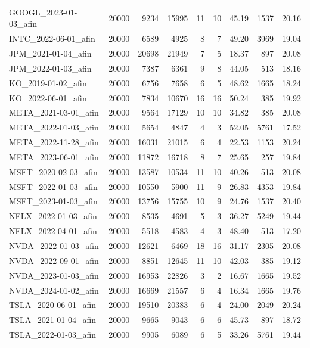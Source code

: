 \documentclass[10pt,a4paper,landscape]{article}
\begin{document}
\begin{longtable}{lrrrrrrrr}
GOOGL\_2023-01-03\_afin & 20000 & 9234 & 15995 & 11 & 10 & 45.19 & 1537 & 20.16 \\
INTC\_2022-06-01\_afin & 20000 & 6589 & 4925 & 8 & 7 & 49.20 & 3969 & 19.04 \\
JPM\_2021-01-04\_afin & 20000 & 20698 & 21949 & 7 & 5 & 18.37 & 897 & 20.08 \\
JPM\_2022-01-03\_afin & 20000 & 7387 & 6361 & 9 & 8 & 44.05 & 513 & 18.16 \\
KO\_2019-01-02\_afin & 20000 & 6756 & 7658 & 6 & 5 & 48.62 & 1665 & 18.24 \\
KO\_2022-06-01\_afin & 20000 & 7834 & 10670 & 16 & 16 & 50.24 & 385 & 19.92 \\
META\_2021-03-01\_afin & 20000 & 9564 & 17129 & 10 & 10 & 34.82 & 385 & 20.08 \\
META\_2022-01-03\_afin & 20000 & 5654 & 4847 & 4 & 3 & 52.05 & 5761 & 17.52 \\
META\_2022-11-28\_afin & 20000 & 16031 & 21015 & 6 & 4 & 22.53 & 1153 & 20.24 \\
META\_2023-06-01\_afin & 20000 & 11872 & 16718 & 8 & 7 & 25.65 & 257 & 19.84 \\
MSFT\_2020-02-03\_afin & 20000 & 13587 & 10534 & 11 & 10 & 40.26 & 513 & 20.08 \\
MSFT\_2022-01-03\_afin & 20000 & 10550 & 5900 & 11 & 9 & 26.83 & 4353 & 19.84 \\
MSFT\_2023-01-03\_afin & 20000 & 13756 & 15755 & 10 & 9 & 24.76 & 1537 & 20.40 \\
NFLX\_2022-01-03\_afin & 20000 & 8535 & 4691 & 5 & 3 & 36.27 & 5249 & 19.44 \\
NFLX\_2022-04-01\_afin & 20000 & 5518 & 4583 & 4 & 3 & 48.40 & 513 & 17.20 \\
NVDA\_2022-01-03\_afin & 20000 & 12621 & 6469 & 18 & 16 & 31.17 & 2305 & 20.08 \\
NVDA\_2022-09-01\_afin & 20000 & 8851 & 12645 & 11 & 10 & 42.03 & 385 & 19.12 \\
NVDA\_2023-01-03\_afin & 20000 & 16953 & 22826 & 3 & 2 & 16.67 & 1665 & 19.52 \\
NVDA\_2024-01-02\_afin & 20000 & 16669 & 21557 & 6 & 4 & 16.34 & 1665 & 19.76 \\
TSLA\_2020-06-01\_afin & 20000 & 19510 & 20383 & 6 & 4 & 24.00 & 2049 & 20.24 \\
TSLA\_2021-01-04\_afin & 20000 & 9665 & 9043 & 6 & 6 & 45.73 & 897 & 18.72 \\
TSLA\_2022-01-03\_afin & 20000 & 9905 & 6089 & 6 & 5 & 33.26 & 5761 & 19.44 \\

\end{longtable}
\end{document}
